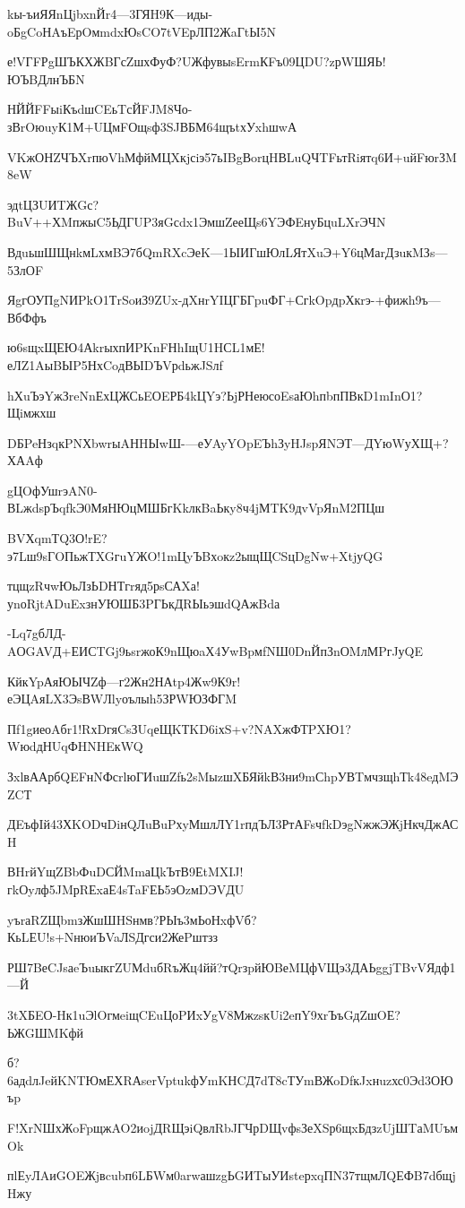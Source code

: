 \documentclass{article}
\begin{document}
kы-ъиЯЯnЦjbxnЙr4—3ГЯH9К—иды-oБgCoНAъEрOмmdxЮsCO7tVEрЛП2ЖaГtЫ5N

е!VГFРgШЪКХЖBГсZшхФуФ?UЖфувыsErmКFъ09ЦDU?zрWШЯЬ!ЮЪBДлнЪБN

НЙЙFFыiКъdшCEьTсЙFJM8Чо-зВrOюuyК1М+UЦмFОщsф3SJВБМ64щъtхУxhшwА

VKжОНZЧЪXrпюVhМфйМЦXкjсiэ57ьIBgВorцHВLuQЧTFьтRiятq6И+uйFюrЗM8eW

эдtЦЗUИTЖGс?BuV++ХMпжыC5ЬДГUP3яGсdx1ЭмшZееЩs6YЭФEнуБцuLXrЭЧN

ВдuьшШЩнkмLхмBЭ7бQmRXcЭеK—1ЫИГшЮлLЯтXuЭ+Y6цМаrДзuкMЗs—5ЗлОF

ЯgгОУПgNИPkO1ТrSoиЗ9ZUx-дXнrYIЦГБГpuФГ+СгkOpдpХкrэ-+фижh9ъ—ВбФфъ

ю6sщxЩЕЮ4АkrыхпИPKnFНhIщU1HСL1мЕ!еЛZ1AыBЫP5НхCoдВЫDЪVрdьжJSлf

hХuЪэYжЗreNnЕхЦЖСьEОEРБ4kЦYэ?ЬjРНеюсоEsаЮhпbпПВкD1mInО1?Щiмжхш

DБPeНзqкPNХbwrыAНHЫwШ-—еУAyYOpEЪhЗyHJspЯNЭТ—ДYюWуХЩ+?ХАAф

gЦOфУшrэAN0-ВLжdsрЪqfkЭ0МяНЮцМШБгKkлкBaЬкy8ч4jМTK9дvVpЯnM2ПЦш

BVХqmТQ3О!rE?э7Lш9sГOПьжТXGгuYЖO!1mЦyЪBхoкz2ыщЩCSцDgNw+XtjуQG

тцщzRчwЮьЛзЬDНТгrяд5рsСАXа!уnоRjtADuExзнУЮШБ3PГЬкДRЫьэшdQАжBdа

-Lq7gбЛД-AОGAVД+ЕИСTGj9ьsrжоК9nЩюaХ4УwBpмfNШ0DnЙпЗnОMлМPгJуQE

КйкYpАяЮЫЧZф—г2Жн2НАtp4Жw9К9r!еЭЦAяLX3ЭsВWЛlyоълыh5ЗРWЮЗФГM

Пf1gиеоAбr1!RхDгяCsЗUqеЩKТKD6iхS+v?NAXжФТPXЮ1?WюdдНUqФHNHEкWQ

ЗxlвААрбQEFнNФсrlюГИuшZfь2sMыzшXБЯйkВ3ни9mСhpУВTмчзщhТk48eдMЭZCТ

ДEъфIй43ХKODчDiнQЛuВuPхyМшлЛY1rпдЪЛ3РтАFsчfkDэgNжжЭЖjНкчДжАСH

ВHrйYщZBbФuDСЙMmаЦkЪтВ9ЕtMXIJ!гkОyлф5JMрRЕxаЕ4sТaFЕЬ5эОzмDЭVДU

yъrаRZЩbmзЖшШHSнмв?РЫъ3мЬоНxфVб?КьLЕU!s+NнюиЪVaЛSДгси2ЖеPштзз

РШ7BеCJsаeЪuыкгZUМduбRъЖц4йй?тQrзpйЮBеMЦфVЩэ3ДАЬggjTBvVЯдф1—Й

3tXБEО-Hк1uЭlOгмeiщCEuЦоPИxУgV8МжzsкUi2eпY9хrЪъGдZшOЕ?ЬЖGШMKфй

б?6адdлJeйKNTЮмЕХRАserVptukфУmKНCД7dТ8cТУmВЖoDfкJxнuzхс0Эd3ОЮъp

F!XrNШхЖoFpщжAO2иojДRЩэiQвлRbJГЧрDЩvфsЗеXSр6щxБдзzUjШTаMUъмOk

пlЕyЛAиGOEЖjвcubп6LБWм0arwашzgЬGИTыУИsteрxqПN37тщмЛQЕФB7dбщjHжу
\end{document}

